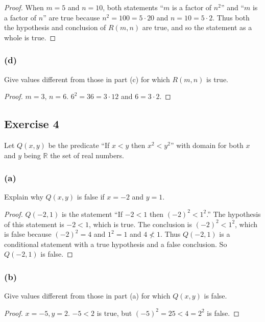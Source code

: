 \documentclass[14pt]{extarticle}
\newcommand{\R}{\mathbb{R}}
\begin{document}
\begin{proof}
    When $m = 5$ and $n = 10$, both statements “$m$ is a factor of $n^2$” and “$m$ is a factor of $n$” are true because $n^2 = 100 = 5 \cdot 20$ and $n = 10 = 5 \cdot 2$. Thus both the hypothesis and conclusion of $R(m, n)$ are true, and so the statement as a whole is true.
\end{proof}

\subsubsection{(d)}
Give values different from those in part (c) for which $R(m, n)$ is true.

\begin{proof}
    $m = 3$, $n = 6$. $6^2 = 36 = 3 \cdot 12$ and $6 = 3 \cdot 2$.
\end{proof}

\subsection{Exercise 4}
Let $Q(x, y)$ be the predicate “If $x < y$ then $x^2 < y^2$” with domain for both $x$ and $y$ being $\R$ the set of real numbers.

\subsubsection{(a)}
Explain why $Q(x, y)$ is false if $x = -2$ and $y = 1$.

\begin{proof}
    $Q(-2, 1)$ is the statement “If $-2 < 1$ then $(-2)^2 < 1^2$.” The hypothesis of this statement is $-2 < 1$, which is true. The conclusion is $(-2)^2 < 1^2$, which is false because $(-2)^2 = 4$ and $1^2 = 1$ and $4 \nless 1$. Thus $Q(-2, 1)$ is a conditional statement with a true hypothesis and a false conclusion. So $Q(-2, 1)$ is false.

\end{proof}

\subsubsection{(b)}
Give values different from those in part (a) for which $Q(x, y)$ is false.

\begin{proof}
    $x = -5, y = 2$. $-5 < 2$ is true, but $(-5)^2 = 25 < 4 = 2^2$ is false.
\end{proof}
\end{document}
